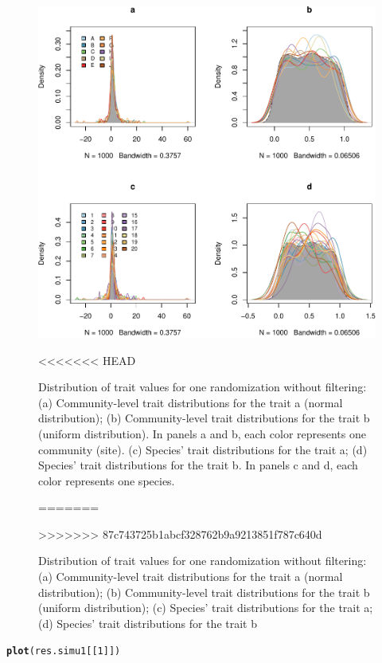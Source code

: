 \documentclass[12pt]{article}\usepackage[]{graphicx}\usepackage[]{color}
\makeatletter
\def\maxwidth{ %
  \ifdim\Gin@nat@width>\linewidth
    \linewidth
  \else
    \Gin@nat@width
  \fi
}
\newcommand{\hlnum}[1]{\textcolor[rgb]{0.686,0.059,0.569}{#1}}%
\newcommand{\hlstd}[1]{\textcolor[rgb]{0.345,0.345,0.345}{#1}}%
\newcommand{\hlkwd}[1]{\textcolor[rgb]{0.737,0.353,0.396}{\textbf{#1}}}%
\newenvironment{kframe}{%
 \def\at@end@of@kframe{}%
 \ifinner\ifhmode%
  \def\at@end@of@kframe{\end{minipage}}%
  \begin{minipage}{\columnwidth}%
 \fi\fi%
 \def\FrameCommand##1{\hskip\@totalleftmargin \hskip-\fboxsep
 \colorbox{shadecolor}{##1}\hskip-\fboxsep
     \hskip-\linewidth \hskip-\@totalleftmargin \hskip\columnwidth}%
 \MakeFramed {\advance\hsize-\width
   \@totalleftmargin\z@ \linewidth\hsize
   \@setminipage}}%
 {\par\unskip\endMakeFramed%
 \at@end@of@kframe}
\newenvironment{knitrout}{}{} %
\makeatother
\begin{document}
\begin{landscape}
\begin{knitrout}
\begin{figure}
{\centering \includegraphics[width=\maxwidth]{figure/No_Filter_plots-1} 

}

<<<<<<< HEAD
\caption[Distribution of trait values for one randomization without filtering]{Distribution of trait values for one randomization without filtering: (a) Community-level trait distributions for the trait a (normal distribution); (b) Community-level trait distributions for the trait b (uniform distribution). In panels a and b, each color represents one community (site). (c) Species' trait distributions for the trait a; (d) Species' trait distributions for the trait b. In panels c and d, each color represents one species.}\label{fig:No_Filter_plots}
=======
\caption[Distribution of trait values for one randomization without filtering]{Distribution of trait values for one randomization without filtering: (a) Community-level trait distributions for the trait a (normal distribution); (b) Community-level trait distributions for the trait b (uniform distribution); (c) Species' trait distributions for the trait a; (d) Species' trait distributions for the trait b}\label{fig:No_Filter_plots}
>>>>>>> 87c743725b1abcf328762b9a9213851f787c640d
\end{figure}


\end{knitrout}

\begin{knitrout}\small
{}\color{fgcolor}\begin{kframe}
\begin{alltt}
\hlkwd{plot}\hlstd{(res.simu1[[}\hlnum{1}\hlstd{]])}
\end{alltt}
\end{kframe}\begin{figure}


\end{figure}
\end{knitrout}
\end{landscape}
\end{document}

